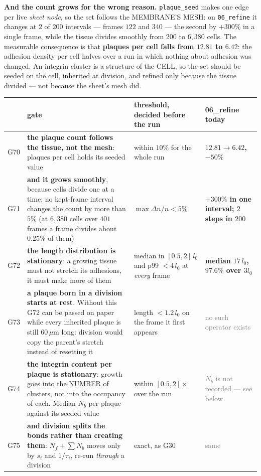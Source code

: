 \documentclass[10pt,a4paper]{article}
\newcommand{\FAIL}[1]{\textcolor{failred}{\textbf{#1}}}
\newcommand{\PEND}[1]{\textcolor{gray}{#1}}
\newcommand{\op}[1]{\texttt{#1}}
\begin{document}
\textbf{And the count grows for the wrong reason.} \op{plaque\_seed} makes one edge per live
\emph{sheet node}, so the set follows the MEMBRANE'S MESH: on \op{06\_refine} it changes at $2$ of
$200$ intervals --- frames $122$ and $340$ --- the second by $+300\%$ in a single frame, while the
tissue divides smoothly from $200$ to $6{,}380$ cells. The measurable consequence is that
\textbf{plaques per cell falls from $12.81$ to $6.42$}: the adhesion density per cell halves over a
run in which nothing about adhesion was changed. An integrin cluster is a structure of the CELL, so
the set should be seeded on the cell, inherited at division, and refined only because the tissue
divided --- not because the sheet's mesh did.

\smallskip
{\footnotesize
\begin{tabularx}{\textwidth}{@{}p{0.9cm}Lp{3.5cm}p{2.6cm}@{}}\toprule
& \textbf{gate} & \textbf{threshold, decided before the run} & \textbf{06\_refine today}\\\midrule
G70 & \textbf{the plaque count follows the tissue, not the mesh}: plaques per cell holds its
      seeded value & within $10\%$ for the whole run & \FAIL{$12.81\to6.42$, $-50\%$}\\
G71 & \textbf{and it grows smoothly}, because cells divide one at a time: no kept-frame interval
      changes the count by more than $5\%$ (at $6{,}380$ cells over $401$ frames a frame divides
      about $0.25\%$ of them) & $\max\Delta n/n<5\%$ & \FAIL{$+300\%$ in one interval; $2$ steps in
      $200$}\\
G72 & \textbf{the length distribution is stationary}: a growing tissue must not stretch its
      adhesions, it must make more of them & median in $[0.5,2]\,l_0$ and p99 $<4\,l_0$ at
      \emph{every} frame & \FAIL{median $17\,l_0$, $97.6\%$ over $3l_0$}\\
G73 & \textbf{a plaque born in a division starts at rest}. Without this G72 can be passed on paper
      while every inherited plaque is still $60\,\mu$m long: division would copy the parent's
      stretch instead of resetting it & length $<1.2\,l_0$ on the frame it first appears &
      \PEND{no such operator exists}\\
G74 & \textbf{the integrin content per plaque is stationary}: growth goes into the NUMBER of
      clusters, not into the occupancy of each. Median $N_b$ per plaque against its seeded value &
      within $[0.5,2]\times$ over the run & \PEND{$N_b$ is not recorded --- see below}\\
G75 & \textbf{and division splits the bonds rather than creating them}: $N_f+\sum N_b$ moves only by
      $s_i$ and $1/\tau_i$, re-run \emph{through} a division & exact, as G30 & \PEND{same}\\
\bottomrule\end{tabularx}}
\smallskip
\end{document}
